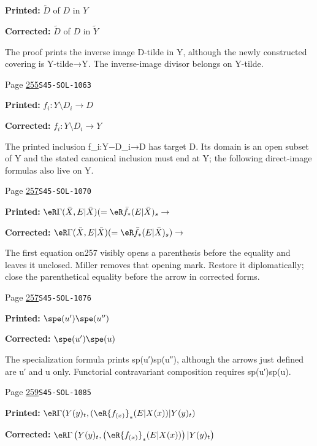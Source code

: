 \begin{description}
\par\noindent\textbf{Printed:} $\widetilde D$ of $D$ in $Y$
\par\noindent\textbf{Corrected:} $\widetilde D$ of $D$ in $\widetilde Y$
\par\noindent The proof prints the inverse image D-tilde in Y, although the newly constructed covering is Y-tilde→Y. The inverse-image divisor belongs on Y-tilde.
\smallskip
\item[\hypertarget{apparatus:EN-0181}{181}] Page \hyperlink{printpage:en:255}{255}\quad\texttt{S45-SOL-1063}
\par\noindent\textbf{Printed:} \(f_i:Y\setminus D_i \to D\)
\par\noindent\textbf{Corrected:} \(f_i:Y\setminus D_i \to Y\)
\par\noindent The printed inclusion f\_i:Y−D\_i→D has target D. Its domain is an open subset of Y and the stated canonical inclusion must end at Y; the following direct-image formulas also live on Y.
\smallskip
\item[\hypertarget{apparatus:EN-0182}{182}] Page \hyperlink{printpage:en:257}{257}\quad\texttt{S45-SOL-1070}
\par\noindent\textbf{Printed:} \(\eR\Gamma(\bar X,E|\bar X) (=\eR\bar f_\ast (E|\bar X)_s \to\)
\par\noindent\textbf{Corrected:} \(\eR\Gamma(\bar X,E|\bar X) (=\eR\bar f_\ast (E|\bar X)_s) \to\)
\par\noindent The first equation on257 visibly opens a parenthesis before the equality and leaves it unclosed. Miller removes that opening mark. Restore it diplomatically; close the parenthetical equality before the arrow in corrected forms.
\smallskip
\item[\hypertarget{apparatus:EN-0183}{183}] Page \hyperlink{printpage:en:257}{257}\quad\texttt{S45-SOL-1076}
\par\noindent\textbf{Printed:} \(\spe(u')\spe(u'')\)
\par\noindent\textbf{Corrected:} \(\spe(u')\spe(u)\)
\par\noindent The specialization formula prints sp(u′)sp(u″), although the arrows just defined are u′ and u only. Functorial contravariant composition requires sp(u′)sp(u).
\smallskip
\item[\hypertarget{apparatus:EN-0184}{184}] Page \hyperlink{printpage:en:259}{259}\quad\texttt{S45-SOL-1085}
\par\noindent\textbf{Printed:} \(\eR\Gamma(Y(y)_t,(\eR {f_{(x)}}_\ast (E|X(x))|Y(y)_t)\)
\par\noindent\textbf{Corrected:} \(\eR\Gamma\left(Y(y)_t,\left(\eR {f_{(x)}}_\ast (E|X(x))\right)|Y(y)_t\right)\)

\end{description}
